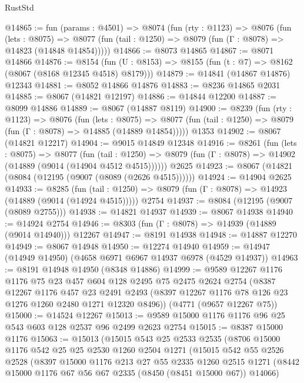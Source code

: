 \begin{lexlean}{RustStd}
\begin{coremodule}
@14865 := fun (params : @4501) =>
  @8074
    (fun (rty : @1123) =>
    @8076
      (fun (lets : @8075) =>
      @8077 (fun (tail : @1250) => @8079 (fun (Γ : @8078) => @14823 (@14848 @14854)))))
@14866 := @8073 @14865
@14867 := @8071 @14866
@14876 := @8154
    (fun (U : @8153) => @8155 (fun (t : @7) => @8162 (@8067 (@8168 @12345 @4518) @8179)))
@14879 := @14841 (@14867 @14876) @12343
@14881 := @8052 @14866 @14876
@14883 := @8236 @14865 @2031
@14885 := @8067 (@14821 @12197)
@14886 := @14844 @12200
@14887 := @8099 @14886
@14889 := @8067 (@14887 @8119)
@14900 := @8239
    (fun (rty : @1123) =>
    @8076
      (fun (lets : @8075) =>
      @8077 (fun (tail : @1250) => @8079 (fun (Γ : @8078) => @14885 (@14889 @14854)))))
    @1353
@14902 := @8067 (@14821 @12217)
@14904 := @9015 @14849 @12348
@14916 := @8261
    (fun (lets : @8075) =>
    @8077
      (fun (tail : @1250) =>
      @8079 (fun (Γ : @8078) => @14902 (@14889 (@9014 (@14904 @4512 @4515))))))
    @2625
@14923 := @8067 (@14821 (@8084 (@12195 (@9007 (@8089 (@2626 @4515))))))
@14924 := @14904 @2625
@14933 := @8285
    (fun (tail : @1250) => @8079 (fun (Γ : @8078) => @14923 (@14889 (@9014 (@14924 @4515)))))
    @2754
@14937 := @8084 (@12195 (@9007 (@8089 @2755)))
@14938 := @14821 @14937
@14939 := @8067 @14938
@14940 := @14924 @2754
@14946 := @8303 (fun (Γ : @8078) => @14939 (@14889 (@9014 @14940))) @12267
@14947 := @8191 @14938
@14948 := @14887 @12270
@14949 := @8067 @14948
@14950 := @12274 @14940
@14959 := @14947 (@14949 @14950) (@4658 @6971 @6967 @14937 @6978 (@4529 @14937))
@14963 := @8191 @14948 @14950 (@8348 @14886)
@14999 := @9589
    @12267
    @1176
    @1176
    @75
    @23
    @457
    @604
    @128
    @2495
    @75
    @2475
    @2624
    @2754
    (@8387
      @12267
      @1176
      @457
      @23
      @2491
      @2493
      (@8397 @12267 @1176 @78 @126 @23 @1276 @1260 @2480 @1271 @12320 @8496))
    (@4771 (@9657 @12267 @75))
@15000 := @14524 @12267
@15013 := @9589 @15000 @1176 @1176 @96 @25 @543 @603 @128 @2537 @96 @2499 @2623 @2754
@15015 := @8387 @15000 @1176
@15063 := @15013
    (@15015
      @543
      @25
      @2533
      @2535
      (@8706
        @15000
        @1176
        @542
        @25
        @25
        @2530
        @1260
        @2504
        @1271
        (@15015
          @542
          @55
          @2526
          @2528
          (@8397
            @15000
            @1176
            @213
            @27
            @55
            @2335
            @1260
            @2515
            @1271
            (@8442 @15000 @1176 @67 @56 @67 @2335 (@8450 (@8451 @15000 @67)) @14066)

\end{coremodule}
\end{lexlean}
